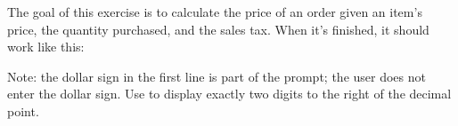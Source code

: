 \begin{exercise} 
\label{ex:purchase}

The goal of this exercise is to calculate the price of an order given an item's price, the quantity purchased, and the sales tax.
When it's finished, it should work like this:


Note: the dollar sign in the first line is part of the prompt; the user does not enter the dollar sign.
Use  to display exactly two digits to the right of the decimal point.

\end{exercise}


